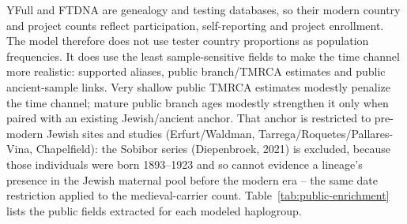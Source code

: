 \documentclass[11pt]{article}
\begin{document}
YFull and FTDNA are genealogy and testing databases, so their modern country and project counts reflect participation, self-reporting and project enrollment. The model therefore does not use tester country proportions as population frequencies. It does use the least sample-sensitive fields to make the time channel more realistic: supported aliases, public branch/TMRCA estimates and public ancient-sample links. Very shallow public TMRCA estimates modestly penalize the time channel; mature public branch ages modestly strengthen it only when paired with an existing Jewish/ancient anchor. That anchor is restricted to pre-modern Jewish sites and studies (Erfurt/Waldman, Tarrega/Roquetes/Pallares-Vina, Chapelfield): the Sobibor series (Diepenbroek, 2021) is excluded, because those individuals were born 1893--1923 and so cannot evidence a lineage's presence in the Jewish maternal pool before the modern era -- the same date restriction applied to the medieval-carrier count. Table~\ref{tab:public-enrichment} lists the public fields extracted for each modeled haplogroup.
\end{document}

